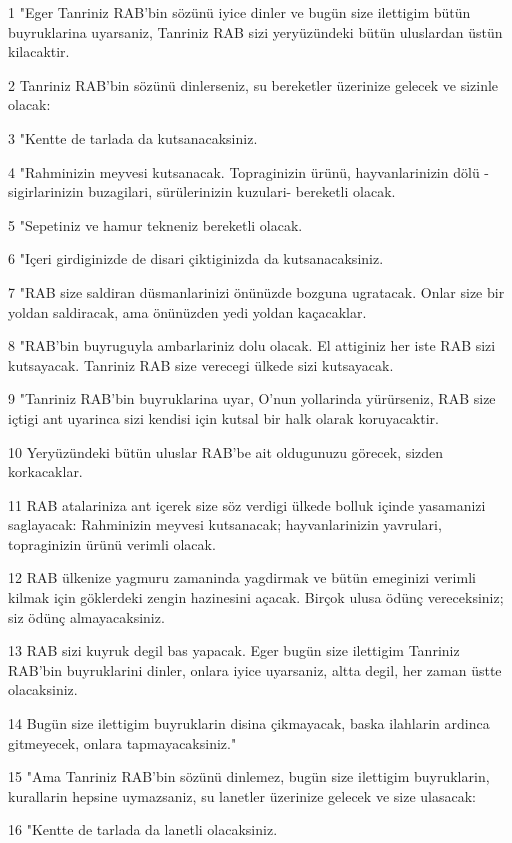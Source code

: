 \par 1 "Eger Tanriniz RAB'bin sözünü iyice dinler ve bugün size ilettigim bütün buyruklarina uyarsaniz, Tanriniz RAB sizi yeryüzündeki bütün uluslardan üstün kilacaktir.
\par 2 Tanriniz RAB'bin sözünü dinlerseniz, su bereketler üzerinize gelecek ve sizinle olacak:
\par 3 "Kentte de tarlada da kutsanacaksiniz.
\par 4 "Rahminizin meyvesi kutsanacak. Topraginizin ürünü, hayvanlarinizin dölü -sigirlarinizin buzagilari, sürülerinizin kuzulari- bereketli olacak.
\par 5 "Sepetiniz ve hamur tekneniz bereketli olacak.
\par 6 "Içeri girdiginizde de disari çiktiginizda da kutsanacaksiniz.
\par 7 "RAB size saldiran düsmanlarinizi önünüzde bozguna ugratacak. Onlar size bir yoldan saldiracak, ama önünüzden yedi yoldan kaçacaklar.
\par 8 "RAB'bin buyruguyla ambarlariniz dolu olacak. El attiginiz her iste RAB sizi kutsayacak. Tanriniz RAB size verecegi ülkede sizi kutsayacak.
\par 9 "Tanriniz RAB'bin buyruklarina uyar, O'nun yollarinda yürürseniz, RAB size içtigi ant uyarinca sizi kendisi için kutsal bir halk olarak koruyacaktir.
\par 10 Yeryüzündeki bütün uluslar RAB'be ait oldugunuzu görecek, sizden korkacaklar.
\par 11 RAB atalariniza ant içerek size söz verdigi ülkede bolluk içinde yasamanizi saglayacak: Rahminizin meyvesi kutsanacak; hayvanlarinizin yavrulari, topraginizin ürünü verimli olacak.
\par 12 RAB ülkenize yagmuru zamaninda yagdirmak ve bütün emeginizi verimli kilmak için göklerdeki zengin hazinesini açacak. Birçok ulusa ödünç vereceksiniz; siz ödünç almayacaksiniz.
\par 13 RAB sizi kuyruk degil bas yapacak. Eger bugün size ilettigim Tanriniz RAB'bin buyruklarini dinler, onlara iyice uyarsaniz, altta degil, her zaman üstte olacaksiniz.
\par 14 Bugün size ilettigim buyruklarin disina çikmayacak, baska ilahlarin ardinca gitmeyecek, onlara tapmayacaksiniz."
\par 15 "Ama Tanriniz RAB'bin sözünü dinlemez, bugün size ilettigim buyruklarin, kurallarin hepsine uymazsaniz, su lanetler üzerinize gelecek ve size ulasacak:
\par 16 "Kentte de tarlada da lanetli olacaksiniz.
